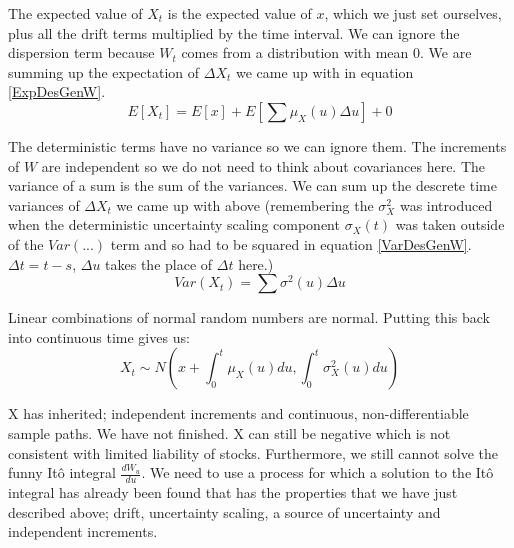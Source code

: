 The expected value of $X_t$ is the expected value of $x$, which we just set
ourselves, plus all the drift terms multiplied by the time interval. We can
ignore the dispersion term because $W_t$ comes from a distribution with mean 0.
We are summing up the expectation of $\Delta X_t$ we came up with in equation
\ref{ExpDesGenW}.
\begin{equation}
    E[X_t]=E[x]+E \left[ \sum \mu_X(u)\Delta u\right] +0
\end{equation}

The deterministic terms have no variance so we can ignore them. The increments
of $W$ are independent so we do not need to think about covariances here. The
variance of a sum is the sum of the variances. We can sum up the descrete time
variances of $\Delta X_t$ we came up with above (remembering the $\sigma_X^2$
was introduced when the deterministic uncertainty scaling component
$\sigma_X(t)$ was taken outside of the $Var(...)$ term and so had to be
squared in equation \ref{VarDesGenW}. $\Delta t=t-s$, $\Delta u$ takes the
place of $\Delta t$ here.)
\begin{equation}
    Var(X_t)=\sum \sigma^2(u)\Delta u
\end{equation}

Linear combinations of normal random numbers are normal. Putting this back
into continuous time gives us:
\begin{equation}
    X_t \sim N \left( x+ \int_0^t \mu_X(u)du, \int_0^t \sigma_X^2(u)du \right)
\end{equation}

X has inherited; independent increments and continuous, non-differentiable
sample paths. We have not finished. X can still be negative which is not
consistent with limited liability of stocks. Furthermore, we still cannot solve
the funny It\^o integral $\frac{dW_u}{du}$. We need to use a process for which
a solution to the It\^o integral has already been found that has the properties
that we have just described above; drift, uncertainty scaling, a source of
uncertainty and independent increments.
